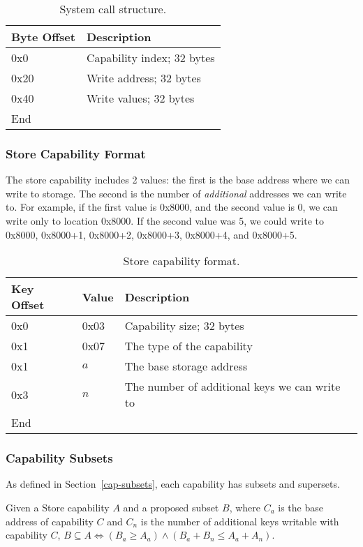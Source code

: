 \documentclass[english,a4paper]{article}
\let\oldparagraph\subsubsection
\renewcommand{\subsubsection}[1]{\oldparagraph{#1}\mbox{}}
\begin{document}
\begin{table}[H]
  \caption{System call structure.}
  \centering{}%
  \begin{tabular}{l|p{}}
    \hline
    Byte Offset & Description\tabularnewline
    \hline
    \hline
    0x0 & Capability index; 32 bytes \tabularnewline
    0x20 & Write address; 32 bytes \tabularnewline
    0x40 & Write values; 32 bytes \tabularnewline
    \hline
    End &  \tabularnewline
    \hline
  \end{tabular}
\end{table}

\subsubsection{Store Capability Format}
The store capability includes 2 values: the first is the base address where we
can write to storage. The second is the number of \emph{additional} addresses we
can write to. For example, if the first value is 0x8000, and the second value is
0, we can write only to location 0x8000. If the second value was 5, we could
write to 0x8000, 0x8000+1, 0x8000+2, 0x8000+3, 0x8000+4, and 0x8000+5.

\begin{table}[H]
  \caption{Store capability format.}
  \centering{}%
  \begin{tabular}{l|l|p{}}
    \hline
    Key Offset & Value & Description\tabularnewline
    \hline
    \hline
    0x0 & 0x03 & Capability size; 32 bytes \tabularnewline
    0x1 & 0x07 & The type of the capability \tabularnewline
    0x1 & $a$ & The base storage address\tabularnewline
    0x3 & $n$ & The number of additional keys we can write to\tabularnewline
    \hline
    End &  \tabularnewline
    \hline
  \end{tabular}
\end{table}

\subsubsection{Capability Subsets}
As defined in Section~\ref{cap-subsets}, each capability has subsets and
supersets.

Given a Store capability $A$ and a proposed subset $B$, where $C_a$ is the base
address of capability $C$ and $C_n$ is the number of additional keys writable
with capability $C$, $B \subseteq A \iff \left(B_a \geq A_a\right) \land
\left(B_a + B_n \leq A_a + A_n\right)$.
\end{document}
